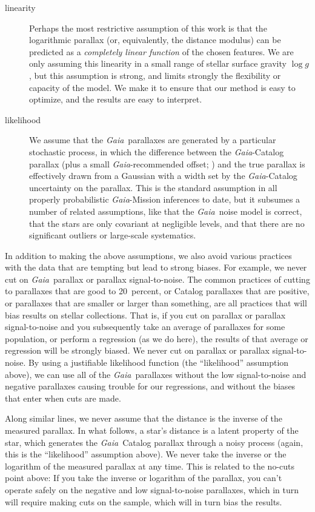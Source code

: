 \documentclass[modern]{aastex62}
\newcommand{\project}[1]{\textsl{#1}}
\newcommand{\gaia}{\project{Gaia}}
\newcommand{\logg}{\log g}
\begin{document}
\begin{description}
\item[linearity] Perhaps the most restrictive assumption of this work is that
the logarithmic parallax (or, equivalently, the distance modulus) 
can be predicted as a \emph{completely linear function} of
the chosen features. We are only assuming this linearity in a small range of stellar
surface gravity $\logg$, but this assumption is strong, and limits strongly the
flexibility or capacity of the model.
We make it to ensure that our method is easy to optimize, and the results are easy
to interpret.

\item[likelihood] We assume that the \gaia\ parallaxes are generated by a particular
stochastic process, in which the difference between the \gaia-Catalog parallax (plus
a small \gaia-recommended offset; \citealt{lindegren}) and the true parallax is effectively drawn from a
Gaussian with a width set by the \gaia-Catalog uncertainty on the parallax.
This is the standard assumption in all properly probabilistic \gaia-Mission inferences
to date, but it subsumes a number of related assumptions, like that the \gaia\ noise
model is correct, that the stars are only covariant at negligible levels, and that
there are no significant outliers or large-scale systematics.
\end{description}

In addition to making the above assumptions, we also avoid various practices
with the data that are tempting but lead to strong biases.
For example, we never cut on \gaia\ parallax or parallax signal-to-noise.
The common practices of cutting to parallaxes that are good to 20~percent,
or Catalog parallaxes that are positive, or parallaxes that are smaller or
larger than something, are all practices that will bias results on stellar
collections.
That is, if you cut on parallax or parallax signal-to-noise and you subsequently
take an average of parallaxes for some population, or perform a regression (as we
do here), the results of that average or regression will be strongly biased.
We never cut on parallax or parallax signal-to-noise.
By using a justifiable likelihood function (the ``likelihood'' assumption above),
we can use all of the \gaia\ parallaxes without the low signal-to-noise and
negative parallaxes causing trouble for our regressions, and without the biases
that enter when cuts are made.

Along similar lines, we never assume that the distance is the inverse of the
measured parallax.
In what follows, a star's distance is a latent property of the star, which generates
the \gaia\ Catalog parallax through a noisy process (again, this is
the ``likelihood'' assumption above).
We never take the inverse or the logarithm of the measured parallax at any time.
This is related to the no-cuts point above:
If you take the inverse or logarithm of the parallax, you can't operate safely
on the negative and low signal-to-noise parallaxes, which in turn will require
making cuts on the sample, which will in turn bias the results.
\end{document}
